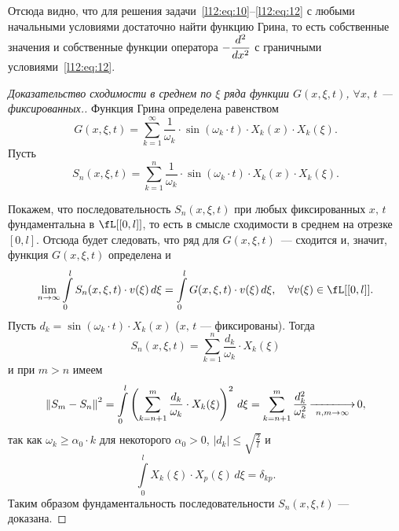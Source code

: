 Отсюда видно, что для решения задачи~\eqref{l12:eq:10}--\eqref{l12:eq:12} с любыми начальными условиями достаточно найти функцию Грина, то есть собственные значения и собственные функции оператора $-\displaystyle\frac{d^2}{dx^2}$ с граничными условиями~\eqref{l12:eq:12}.
\begin{proof}[Доказательство сходимости в среднем по $\xi$ ряда функции $G(x,\xi,t)$, $\forall x,\,t$ --- фиксированных.]
	
\noindent Функция Грина определена равенством 
\begin{equation*}
	G(x,\xi,t)=\sum\limits_{k=1}^{\infty}\frac{1}{\omega_k}\cdot\sin(\omega_k\cdot t)\cdot X_k(x)\cdot X_k(\xi).
\end{equation*}
Пусть
\begin{equation*}
	S_n(x,\xi,t)=\sum\limits_{k=1}^{n}\frac{1}{\omega_k}\cdot\sin(\omega_k\cdot t)\cdot X_k(x)\cdot X_k(\xi).
\end{equation*}

Покажем, что последовательность $S_n(x,\xi,t)$ при любых фиксированных $x,\,t$ фундаментальна в $\fL[{[0,l]}]$, то есть в смысле сходимости в среднем на отрезке $[0,l]$. Отсюда будет следовать, что ряд для $G(x,\xi,t)$~--- сходится и, значит, функция $G(x,\xi,t)$ определена и 
\begin{equation*}
	\lim\limits_{n\to\infty}\int\limits_0^l S_n(x,\xi,t)\cdot v(\xi)\,d\xi=\int\limits_0^l G(x,\xi,t)\cdot v(\xi)\,d\xi,\quad\forall v(\xi)\in\fL[{[0,l]}].
\end{equation*}
Пусть $d_k=\sin(\omega_k\cdot t)\cdot X_k(x)$ ($x,\,t$ --- фиксированы). Тогда 
\begin{equation*}
	S_n(x,\xi,t)=\sum\limits_{k=1}^n\frac{d_k}{\omega_k}\cdot X_k(\xi)
\end{equation*}
и при $m>n$ имеем 
\begin{equation*}
	\norm{S_m-S_n}^2=\int\limits_0^l\left(\sum\limits_{k=n+1}^m\frac{d_k}{\omega_k}\cdot X_k(\xi)\right)^2\,d\xi=\sum\limits_{k=n+1}^m\frac{d_k^2}{\omega_k^2}\mathop{-\!\!\!-\!\!\!-\!\!\!-\!\!\!-\!\!\!\longrightarrow}\limits_{n,m\to\infty}0,
\end{equation*}
так как $\omega_k\geqslant\alpha_0\cdot k$ для некоторого $\alpha_0>0$, $\displaystyle|d_k|\leqslant\sqrt{\frac{2}{l}}$ и
\begin{equation*}
	\int\limits_0^l X_k(\xi)\cdot X_p(\xi)\,d\xi=\delta_{kp}.
\end{equation*} 
Таким образом фундаментальность последовательности $S_n(x,\xi,t)$ --- доказана.
\end{proof}
